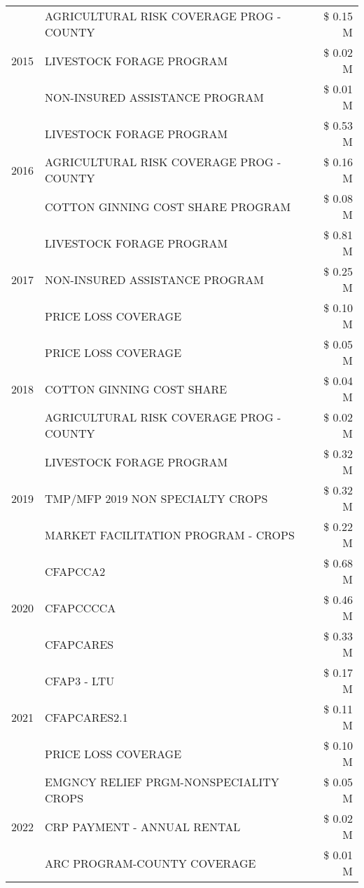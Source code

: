\begin{tabular}{llr}
\cline{1-3}
\multirow[t]{3}{*}{2015} & AGRICULTURAL RISK COVERAGE PROG - COUNTY & \$ 0.15 M \\
 & LIVESTOCK FORAGE PROGRAM & \$ 0.02 M \\
 & NON-INSURED ASSISTANCE PROGRAM & \$ 0.01 M \\
\cline{1-3}
\multirow[t]{3}{*}{2016} & LIVESTOCK FORAGE PROGRAM & \$ 0.53 M \\
 & AGRICULTURAL RISK COVERAGE PROG - COUNTY & \$ 0.16 M \\
 & COTTON GINNING COST SHARE PROGRAM & \$ 0.08 M \\
\cline{1-3}
\multirow[t]{3}{*}{2017} & LIVESTOCK FORAGE PROGRAM & \$ 0.81 M \\
 & NON-INSURED ASSISTANCE PROGRAM & \$ 0.25 M \\
 & PRICE LOSS COVERAGE & \$ 0.10 M \\
\cline{1-3}
\multirow[t]{3}{*}{2018} & PRICE LOSS COVERAGE & \$ 0.05 M \\
 & COTTON GINNING COST SHARE & \$ 0.04 M \\
 & AGRICULTURAL RISK COVERAGE PROG - COUNTY & \$ 0.02 M \\
\cline{1-3}
\multirow[t]{3}{*}{2019} & LIVESTOCK FORAGE PROGRAM & \$ 0.32 M \\
 & TMP/MFP 2019 NON SPECIALTY CROPS & \$ 0.32 M \\
 & MARKET FACILITATION PROGRAM - CROPS & \$ 0.22 M \\
\cline{1-3}
\multirow[t]{3}{*}{2020} & CFAPCCA2 & \$ 0.68 M \\
 & CFAPCCCCA & \$ 0.46 M \\
 & CFAPCARES & \$ 0.33 M \\
\cline{1-3}
\multirow[t]{3}{*}{2021} & CFAP3 - LTU & \$ 0.17 M \\
 & CFAPCARES2.1 & \$ 0.11 M \\
 & PRICE LOSS COVERAGE & \$ 0.10 M \\
\cline{1-3}
\multirow[t]{3}{*}{2022} & EMGNCY RELIEF PRGM-NONSPECIALITY CROPS & \$ 0.05 M \\
 & CRP PAYMENT - ANNUAL RENTAL & \$ 0.02 M \\
 & ARC PROGRAM-COUNTY COVERAGE & \$ 0.01 M \\
\cline{1-3}
\bottomrule
\end{tabular}
